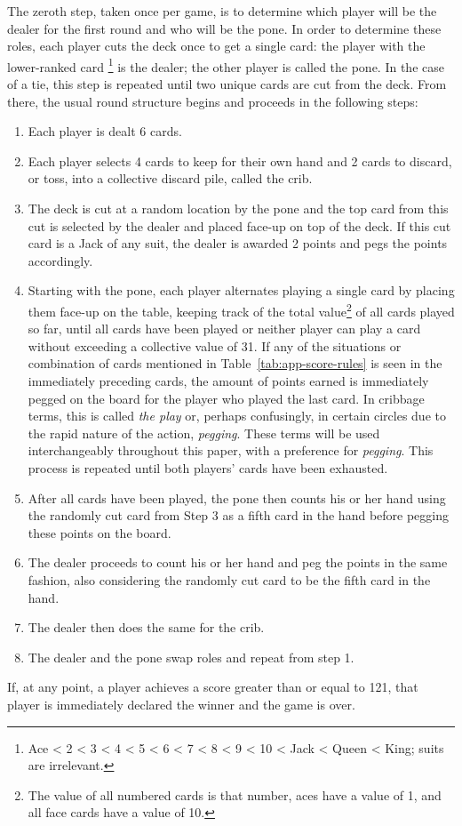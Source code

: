 The zeroth step, taken once per game, is to determine which player will be the
dealer for the first round and who will be the pone.
%
In order to determine these roles,
each player cuts the deck once to get a single card:
the player with the lower-ranked card%
\footnote{Ace < 2 < 3 < 4 < 5 < 6 < 7 < 8 < 9 < 10 < Jack < Queen < King;
suits are irrelevant.}
is the dealer;
the other player is called the pone.
In the case of a tie, this step is repeated until two unique cards are
cut from the deck.
%
From there, the usual round structure begins and proceeds in the following
steps:
%
\begin{enumerate} %
%
\item Each player is dealt 6 cards.
%
\item Each player selects 4 cards to keep for their own hand and 2 cards to
	discard, or toss, into a collective discard pile, called the crib.
%
\item The deck is cut at a random location by the pone
	and the top card from this cut is selected by the dealer and placed
	face-up on top of the deck.
	If this cut card is a Jack of any suit,
	the dealer is awarded 2 points and pegs the points accordingly.
%
\item Starting with the pone, each player alternates playing a single card
	by placing them face-up on the table,
	keeping track of the total value\footnote{
		The value of all numbered cards is that number, aces have
		a value of 1, and all face cards have a value of 10.
	}
	of all cards played so far,
	until all cards have been played
	or neither player can play a card without exceeding a collective value of
	31.
	If any of the situations or combination of cards mentioned in
	Table~\ref{tab:app-score-rules} is seen in the immediately preceding cards,
	the amount of points earned is immediately pegged on the board for the
	player who played the last card.
	In cribbage terms, this is called \textit{the play}
	or, perhaps confusingly,
	in certain circles due to the rapid nature of the
	action, \textit{pegging}.
	These terms will be used interchangeably throughout this paper,
	with a preference for \textit{pegging}.
	This process is repeated until both players' cards have been exhausted.
%
\item After all cards have been played,
	the pone then counts his or her hand
	using the randomly cut card from Step 3 as a
	fifth card in the hand before pegging these points on the board.
%
\item The dealer proceeds to count his or her hand and peg the points
	in the same fashion, also considering the randomly cut card to be the
	fifth card in the hand.
%
\item The dealer then does the same for the crib.
%
\item The dealer and the pone swap roles and repeat from step 1.
%
\end{enumerate}
%
If, at any point, a player achieves a score greater than or equal to 121,
that player is immediately declared the winner and the game is over.


